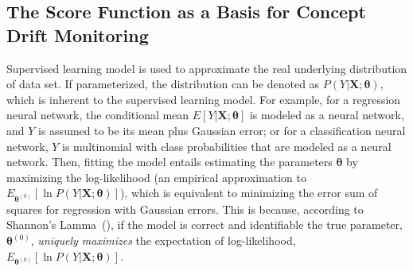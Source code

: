 \documentclass[twoside,11pt]{article}
\begin{document}

\subsection{The Score Function as a Basis for Concept Drift Monitoring}
\label{ss:score_func}

Supervised learning model is used to approximate the real underlying distribution of data set. If parameterized, the distribution can be denoted as $P(Y|\bm{X};\bm{\theta})$, which is inherent to the supervised learning model. For example, for a regression neural network, the conditional mean $E[Y|\bm{X};\bm{\theta}]$ is modeled as a neural network, and $Y$ is assumed to be its mean plus Gaussian error; or for a classification neural network, $Y$ is multinomial with class probabilities that are modeled as a neural network. Then, fitting the model entails estimating the parameters $\bm{\theta}$ by maximizing the log-likelihood (an empirical approximation to $E_{\bm{\theta}^{(0)}}[\ln{P(Y|\bm{X};\bm{\theta})}]$), which is equivalent to minimizing the error sum of squares for regression with Gaussian errors. This is because, according to Shannon's Lamma~(\cite{shannon1948mathematical}), if the model is correct and identifiable the true parameter, $\bm{\theta}^{(0)}$, \textit{uniquely maximizes} the expectation of log-likelihood, $E_{\bm{\theta}^{(0)}}[\ln{P(Y|\bm{X};\bm{\theta})}]$. 
\end{document}
